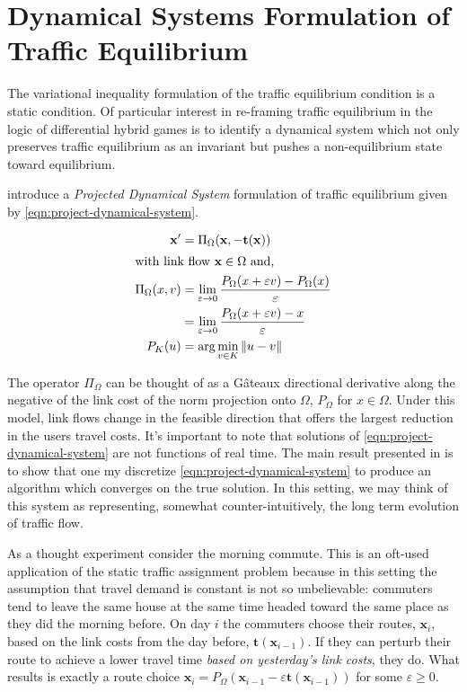 \section{Dynamical Systems Formulation of Traffic Equilibrium}

The variational inequality formulation of the traffic equilibrium condition is a static condition.
Of particular interest in re-framing traffic equilibrium in the logic of differential hybrid games is to identify a dynamical system which not only preserves traffic equilibrium as an invariant but pushes a non-equilibrium state toward equilibrium.

\citet{nagurney1997projected} introduce a \textit{Projected Dynamical System} formulation of traffic equilibrium given by \eqref{eqn:project-dynamical-system}.

\begin{align}
    \mathbf{x}' &= \Pi_{\Omega}(\mathbf{x}, -\mathbf{t}(\mathbf{x}))\label{eqn:project-dynamical-system}\\
    \intertext{with link flow $\mathbf{x} \in \Omega$ and,}
    \Pi_{\Omega}(x, v) &= \lim_{\varepsilon\to 0}\frac{P_{\Omega}(x + \varepsilon v) - P_{\Omega}(x)}{\varepsilon}\\
        &= \lim_{\varepsilon\to 0}\frac{P_{\Omega}(x + \varepsilon v) - x}{\varepsilon}\\
    P_{K}(u) &= \arg\min_{v\in K} \| u-v\|
\end{align}

The operator $\Pi_{\Omega}$ can be thought of as a G\^{a}teaux directional derivative along the negative of the link cost of the norm projection onto $\Omega$, $P_{\Omega}$ for $x\in \Omega$.
Under this model, link flows change in the feasible direction that offers the largest reduction in the users travel costs.
It's important to note that solutions of \eqref{eqn:project-dynamical-system} are not functions of real time.
The main result presented in \citet{nagurney1997projected} is to show that one my discretize \eqref{eqn:project-dynamical-system} to produce an algorithm which converges on the true solution.
In this setting, we may think of this system as representing, somewhat counter-intuitively, the long term evolution of traffic flow.

As a thought experiment consider the morning commute.
This is an oft-used application of the static traffic assignment problem because in this setting the assumption that travel demand is constant is not so unbelievable: commuters tend to leave the same house at the same time headed toward the same place as they did the morning before.
On day $i$ the commuters choose their routes, $\mathbf{x}_{i}$, based on the link costs from the day before, $\mathbf{t}(\mathbf{x}_{i-1})$.
If they can perturb their route to achieve a lower travel time \textit{based on yesterday's link costs}, they do.
What results is exactly a route choice $\mathbf{x}_i = P_{\Omega}(\mathbf{x}_{i-1}-\varepsilon \mathbf{t}(\mathbf{x}_{i-1}))$ for some $\varepsilon \geq 0$.

